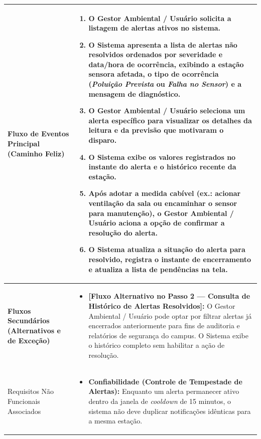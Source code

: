 \documentclass[11pt, a4paper]{article}
\begin{document}
\begin{longtable}{|>{\bfseries}p{3.8cm}|p{12.2cm}|}
Fluxo de Eventos Principal (Caminho Feliz) & 
\begin{enumerate}[nosep, leftmargin=0.5cm]
    \item O Gestor Ambiental / Usuário solicita a listagem de alertas ativos no sistema.
    \item O Sistema apresenta a lista de alertas não resolvidos ordenados por severidade e data/hora de ocorrência, exibindo a estação sensora afetada, o tipo de ocorrência (\emph{Poluição Prevista} ou \emph{Falha no Sensor}) e a mensagem de diagnóstico.
    \item O Gestor Ambiental / Usuário seleciona um alerta específico para visualizar os detalhes da leitura e da previsão que motivaram o disparo.
    \item O Sistema exibe os valores registrados no instante do alerta e o histórico recente da estação.
    \item Após adotar a medida cabível (ex.: acionar ventilação da sala ou encaminhar o sensor para manutenção), o Gestor Ambiental / Usuário aciona a opção de confirmar a resolução do alerta.
    \item O Sistema atualiza a situação do alerta para resolvido, registra o instante de encerramento e atualiza a lista de pendências na tela.
\end{enumerate} \\ \hline

Fluxos Secundários (Alternativos e de Exceção) & 
\begin{itemize}[nosep, leftmargin=0.5cm]
    \item \textbf{[Fluxo Alternativo no Passo 2 --- Consulta de Histórico de Alertas Resolvidos]:} O Gestor Ambiental / Usuário pode optar por filtrar alertas já encerrados anteriormente para fins de auditoria e relatórios de segurança do campus. O Sistema exibe o histórico completo sem habilitar a ação de resolução.
\end{itemize} \\ \hline

Requisitos Não Funcionais Associados & 
\begin{itemize}[nosep, leftmargin=0.5cm]
    \item \textbf{Confiabilidade (Controle de Tempestade de Alertas):} Enquanto um alerta permanecer ativo dentro da janela de \emph{cooldown} de 15 minutos, o sistema não deve duplicar notificações idênticas para a mesma estação.
\end{itemize} \\ \hline
\end{longtable}
\end{document}
